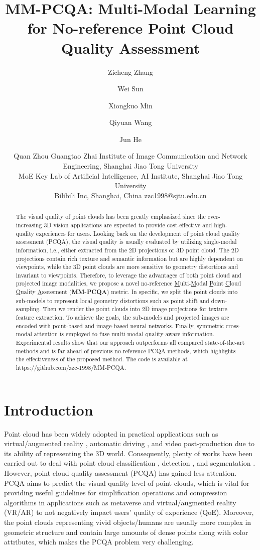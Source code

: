 \documentclass{article}
\title{MM-PCQA: Multi-Modal Learning for No-reference Point Cloud Quality Assessment}
\author{
Zicheng Zhang
\and
Wei Sun\and
Xiongkuo Min\and
Qiyuan Wang\and
Jun He \and
Quan Zhou \And
Guangtao Zhai
\affiliations
Institute of Image Communication and Network Engineering, Shanghai Jiao Tong University\\
MoE Key Lab of Artificial Intelligence, AI Institute, Shanghai Jiao Tong University\\
Bilibili Inc, Shanghai, China
\emails
zzc1998@sjtu.edu.cn
}
\begin{document}
\maketitle



\begin{abstract}
    The visual quality of point clouds has been greatly emphasized since the ever-increasing 3D vision applications are expected to provide cost-effective and high-quality experiences for users.  Looking back on the development of point cloud quality assessment (PCQA), the visual quality is usually evaluated by utilizing single-modal information, i.e., either extracted from the 2D projections or 3D point cloud. The 2D projections contain rich texture and semantic information but are highly dependent on viewpoints, while the 3D point clouds are more sensitive to geometry distortions and invariant to viewpoints. Therefore, to leverage the advantages of both point cloud and projected image modalities, we propose a novel no-reference \underline{M}ulti-\underline{M}odal \underline{P}oint \underline{C}loud \underline{Q}uality \underline{A}ssessment (\textbf{MM-PCQA}) metric. In specific, we split the point clouds into sub-models to represent local geometry distortions such as point shift and down-sampling. Then we render the point clouds into 2D image projections for texture feature extraction. To achieve the goals, the sub-models and projected images are encoded with point-based and image-based neural networks. Finally, symmetric cross-modal attention is employed to fuse multi-modal quality-aware information. Experimental results show that our approach outperforms all compared state-of-the-art methods and is far ahead of previous no-reference PCQA methods, which highlights the effectiveness of the proposed method. The code is available at https://github.com/zzc-1998/MM-PCQA.
\end{abstract}

\section{Introduction}
Point cloud has been widely adopted in practical applications such as virtual/augmented reality \cite{park2008multiple}, automatic driving \cite{cui2021deep}, and video post-production \cite{mekuria2016design} due to its ability of representing the 3D world. Consequently, plenty of works have been carried out to deal with point cloud classification \cite{grilli2017review,ku2018joint,wang2019frustum,vora2020pointpainting,xie2020pi,yoo20203d,chen2020object}, detection \cite{cui2021deep}, and segmentation \cite{cheng2021sspc,liutoposeg}. However, point cloud quality assessment (PCQA) has gained less attention. PCQA aims to predict the visual quality level of point clouds, which is vital for providing useful guidelines for simplification operations and compression algorithms in applications such as metaverse and virtual/augmented reality (VR/AR) \cite{fan2022d} to not negatively impact users' quality of experience (QoE). Moreover, the point clouds representing vivid objects/humans are usually more complex in geometric structure and contain large amounts of dense points along with color attributes, which makes the PCQA problem very challenging. 
\end{document}

